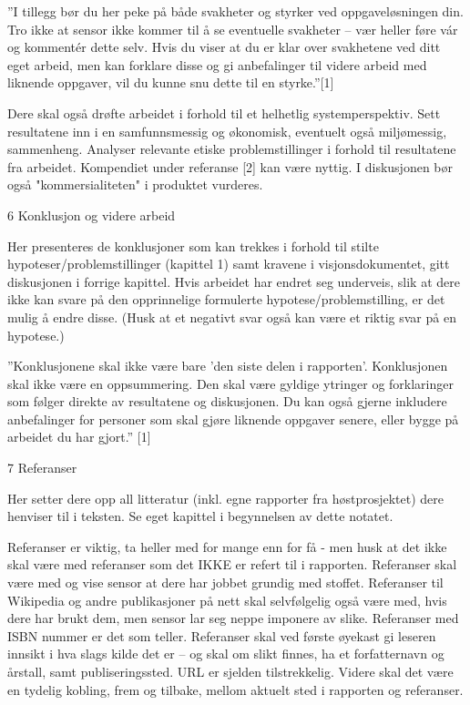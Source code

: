 ”I tillegg bør du her peke på både svakheter og styrker ved oppgaveløsningen din. Tro ikke at sensor ikke kommer til å se eventuelle svakheter – vær heller føre vár og kommentér dette selv. Hvis du viser at du er klar over svakhetene ved ditt eget arbeid, men kan forklare disse og gi anbefalinger til videre arbeid med liknende oppgaver, vil du kunne snu dette til en styrke.”[1]

Dere skal også drøfte arbeidet i forhold til et helhetlig systemperspektiv. Sett resultatene inn i en samfunnsmessig og økonomisk, eventuelt også miljømessig, sammenheng. Analyser relevante etiske problemstillinger i forhold til resultatene fra arbeidet. Kompendiet under referanse [2] kan være nyttig. I diskusjonen bør også "kommersialiteten" i produktet vurderes.

6 Konklusjon og videre arbeid

Her presenteres de konklusjoner som kan trekkes i forhold til stilte hypoteser/problemstillinger (kapittel 1) samt kravene i visjonsdokumentet, gitt diskusjonen i forrige kapittel. Hvis arbeidet har endret seg underveis, slik at dere ikke kan svare på den opprinnelige formulerte hypotese/problemstilling, er det mulig å endre disse. (Husk at et negativt svar også kan være et riktig svar på en hypotese.)

”Konklusjonene skal ikke være bare ’den siste delen i rapporten’. Konklusjonen skal ikke være en oppsummering. Den skal være gyldige ytringer og forklaringer som følger direkte av resultatene og diskusjonen. Du kan også gjerne inkludere anbefalinger for personer som skal gjøre liknende oppgaver senere, eller bygge på arbeidet du har gjort.” [1]

7 Referanser

Her setter dere opp all litteratur (inkl. egne rapporter fra høstprosjektet) dere henviser til i teksten. Se eget kapittel i begynnelsen av dette notatet.

Referanser er viktig, ta heller med for mange enn for få - men husk at det ikke skal være med referanser som det IKKE er refert til i rapporten. Referanser skal være med og vise sensor at dere har jobbet grundig med stoffet. Referanser til Wikipedia og andre publikasjoner på nett skal selvfølgelig også være med, hvis dere har brukt dem, men sensor lar seg neppe imponere av slike. Referanser med ISBN nummer er det som teller. Referanser skal ved første øyekast gi leseren innsikt i hva slags kilde det er – og skal om slikt finnes, ha et forfatternavn og årstall, samt publiseringssted. URL er sjelden tilstrekkelig. Videre skal det være en tydelig kobling, frem og tilbake, mellom aktuelt sted i rapporten og referanser.

